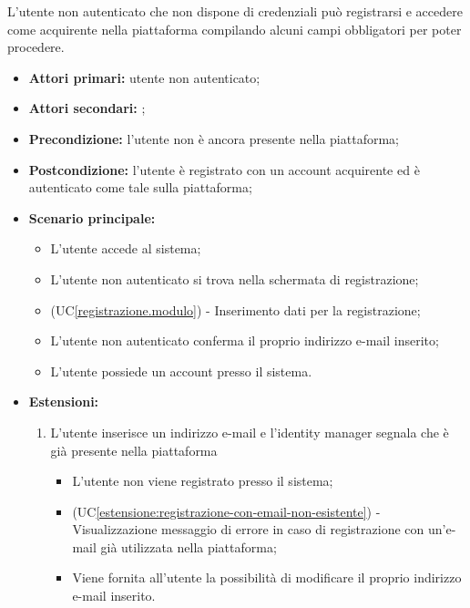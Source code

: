 \label{registrazione}


L'utente non autenticato che non dispone di credenziali può registrarsi e accedere come acquirente nella piattaforma compilando alcuni campi obbligatori per poter procedere.
\begin{itemize}
	\item \textbf{Attori primari:} utente non autenticato;
	\item \textbf{Attori secondari:} ;
	\item \textbf{Precondizione:} l'utente non è ancora presente nella piattaforma;
	\item \textbf{Postcondizione:} l'utente è registrato con un account acquirente ed è autenticato come tale sulla piattaforma;
	\item \textbf{Scenario principale:}
	\begin{itemize}
		\item L'utente accede al sistema;
		\item L'utente non autenticato si trova nella schermata di registrazione;
		\item (UC\ref{registrazione.modulo}) - Inserimento dati per la registrazione;
		\item L'utente non autenticato conferma il proprio indirizzo e-mail inserito;
		\item L'utente possiede un account presso il sistema.
	\end{itemize}
	\item \textbf{Estensioni:}
	\begin{enumerate}[label=\lett]
		\item L'utente inserisce un indirizzo e-mail e l'identity manager segnala che è già presente nella piattaforma
		\begin{itemize}
			\item L'utente non viene registrato presso il sistema;
			\item (UC\ref{estensione:registrazione-con-email-non-esistente}) - Visualizzazione messaggio di errore in caso di registrazione con un'e-mail già utilizzata nella piattaforma;
			\item Viene fornita all'utente la possibilità di modificare il proprio indirizzo e-mail inserito.

\end{itemize}
\end{enumerate}
\end{itemize}
